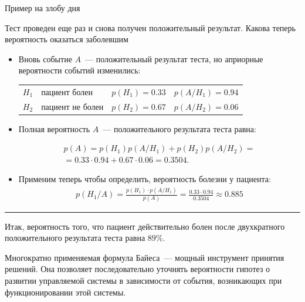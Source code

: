 \documentclass[unicode,11pt,notheorems,xcolor=table]{beamer}
\begin{document}
\begin{frame}[allowframebreaks]{Пример на злобу дня}
    \framebreak
    \begin{exampleblock}{}
        Тест проведен еще раз и снова получен положительный результат. Какова теперь вероятность оказаться заболевшим
    \end{exampleblock}
    \begin{itemize}
        \item Вновь событие $A$~--- положительный результат теста, но априорные вероятности событий изменились:
        \begin{tabular}{l@{\;---\;}l@{\quad}l@{,\quad}l}
            $H_1$ & пациент болен    & $p(H_1)=0.33$ &$p(A/H_1)=0.94$\\
            $H_2$ & пациент не болен & $p(H_2)=0.67$ & $p(A/H_2)=0.06$\\
        \end{tabular}
        \item Полная вероятность $A$~--- положительного результата теста равна:
    
        \begin{multline*}
            p(A)
            =p(H_1)p(A/H_1) + p(H_2)p(A/H_2)
            =\\
            =0.33\cdot 0.94+0.67\cdot 0.06 
            = 0.3504.
        \end{multline*}
        \item Применим теперь  чтобы определить, вероятность болезни у пациента:
        \begin{multline*}
            p(H_1/A) = \frac{p(H_1)\cdot p(A/H_1)}{p(A)} = \frac{0.33\cdot 0.94}{0.3504}  \approx 0.885
        \end{multline*}
    \end{itemize}
    
    \medskip
    \hrule
    \medskip
    
    Итак, вероятность того, что пациент действительно болен после двухкратного положительного результата теста равна $89\%$.
\end{frame}






\begin{frame}{}
    \begin{alertblock}{}
        Многократно применяемая формула Байеса~--- мощный инструмент принятия решений.
        Она позволяет последовательно уточнять вероятности гипотез о развитии управляемой системы в зависимости от события, возникающих при функционировании  этой системы.
    \end{alertblock}
\end{frame}
\end{document}
